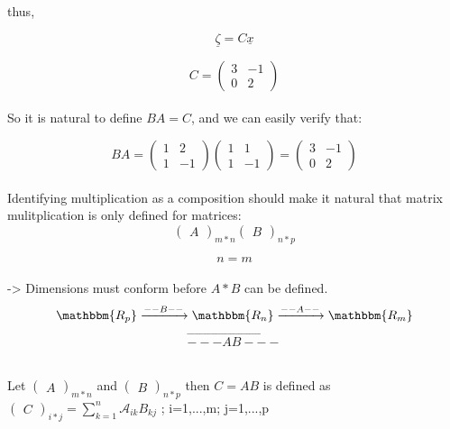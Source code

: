 \documentclass[]{article}
\begin{document}
thus,

\begin{equation}\label{eqn:matrix}\underline{\zeta}=C\underline{x}\end{equation}

\[C = \begin{pmatrix} 3 & -1 \\ 0 & 2 \end{pmatrix}\]\\

So it is natural to define \(BA=C\), and we can easily verify that:

\[BA = \begin{pmatrix} 1 & 2 \\ 1 & -1 \end{pmatrix}\begin{pmatrix} 1 & 1\\ 1 & -1 \end{pmatrix}=\begin{pmatrix} 3 & -1 \\ 0 & 2 \end{pmatrix}\]\\

Identifying multiplication as a composition should make it natural that
matrix mulitplication is only defined for matrices:\\

\[\begin{pmatrix}A\end{pmatrix}_{m*n} \begin{pmatrix}B\end{pmatrix}_{n*p}\]

\[n=m\]\\
 -\textgreater{} Dimensions must conform before \(A*B\) can be
defined.\\

\[\mathbbm{R_p}\xrightarrow{--B--}\mathbbm{R_n}\xrightarrow{--A--}\mathbbm{R_m}\]
\[\overrightarrow{---AB---}\]\\

\begin{tcolorbox}[colback=green!5,colframe=red!40!black,title=Definition]
Let $\begin{pmatrix}A\end{pmatrix}_{m*n}$ and $\begin{pmatrix}B\end{pmatrix}_{n*p}$  then $C=AB$ is defined
as $\begin{pmatrix}C\end{pmatrix}_{i*j} = \sum\limits_{k=1}^n \mathcal A_{ik}B_{kj}$ ; i=1,...,m; j=1,...,p
\end{tcolorbox}
\end{document}
